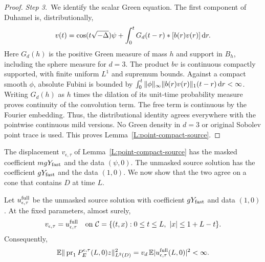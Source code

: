 \begin{proof}
  \medskip
  \noindent\textit{Step 3.~}We identify the scalar Green equation.
  The first component of Duhamel is, distributionally,
  \[
    v(t)=\cos(t\sqrt{-\Delta})\psi+
    \int_0^t G_d(t-r)*[b(r)v(r)]\,\mathrm{d} r .
  \]
  Here $G_d(h)$ is the positive Green measure of mass $h$ and support in $B_h$,
  including the sphere measure for $d = 3$. The product $bv$ is continuous
  compactly supported, with finite uniform $L^1$ and supremum bounds. Against a
  compact smooth $\phi$, absolute Fubini is bounded by
  $\int_0^t\|\phi\|_\infty\|b(r)v(r)\|_1(t-r)\,\mathrm{d} r < \infty$. Writing $G_d(h)$
  as $h$ times the dilation of its unit-time probability measure proves
  continuity of the convolution term. The free term is continuous by the Fourier
  embedding. Thus, the distributional identity agrees everywhere with the
  pointwise continuous mild versions. No Green density in $d = 3$ or original
  Sobolev point trace is used. This proves Lemma~\ref{L:point-compact-source}.
\end{proof}

The displacement $v_{\epsilon,\tau}$ of Lemma~\ref{L:point-compact-source} has
the masked coefficient $mgY_{\rm fast}$ and the data $(\psi,0)$. The unmasked
source solution has the coefficient $gY_{\rm fast}$ and the data $(1,0)$. We now
show that the two agree on a cone that contains $D$ at time $L$.

\begin{proposition}
  \label{P:point-source-cone}
  Let $u_{\epsilon,\tau}^{\rm full}$ be the unmasked source solution with
  coefficient $gY_{\rm fast}$ and data $(1,0)$. At the fixed parameters, almost
  surely,
  \[
    v_{\epsilon,\tau}=u_{\epsilon,\tau}^{\rm full}
    \quad\hbox{on }\mathcal{C}=
    \{(t,x):0\le t\le L,\ |x|\le1+L-t\}.
  \]
  Consequently,
  \begin{equation}\label{E:point-source-square-average}
    \mathbb{E}\|\operatorname{pr}_1P_E^{\epsilon,\tau}(L,0)z\|_{L^2(D)}^2
    =v_d\,\mathbb{E}|u_{\epsilon,\tau}^{\rm full}(L,0)|^2<\infty .
  \end{equation}
\end{proposition}

